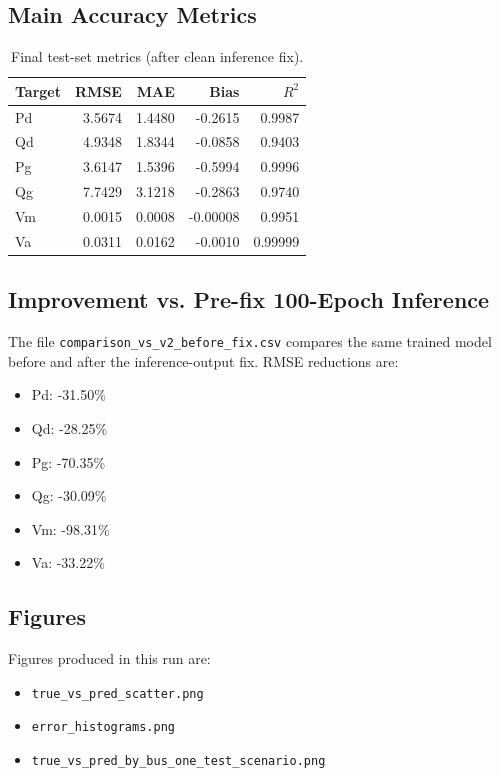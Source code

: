 \documentclass[11pt]{article}
\begin{document}
\subsection{Main Accuracy Metrics}
\begin{table}[h]
\centering
\caption{Final test-set metrics (after clean inference fix).}
\begin{tabular}{lrrrr}
\toprule
Target & RMSE & MAE & Bias & \(R^2\) \\
\midrule
Pd & 3.5674 & 1.4480 & -0.2615 & 0.9987 \\
Qd & 4.9348 & 1.8344 & -0.0858 & 0.9403 \\
Pg & 3.6147 & 1.5396 & -0.5994 & 0.9996 \\
Qg & 7.7429 & 3.1218 & -0.2863 & 0.9740 \\
Vm & 0.0015 & 0.0008 & -0.00008 & 0.9951 \\
Va & 0.0311 & 0.0162 & -0.0010 & 0.99999 \\
\bottomrule
\end{tabular}
\end{table}

\subsection{Improvement vs. Pre-fix 100-Epoch Inference}
The file \texttt{comparison\_vs\_v2\_before\_fix.csv} compares the same trained model before and after the inference-output fix. RMSE reductions are:
\begin{itemize}
    \item Pd: -31.50\%
    \item Qd: -28.25\%
    \item Pg: -70.35\%
    \item Qg: -30.09\%
    \item Vm: -98.31\%
    \item Va: -33.22\%
\end{itemize}

\subsection{Figures}
Figures produced in this run are:
\begin{itemize}
    \item \texttt{true\_vs\_pred\_scatter.png}
    \item \texttt{error\_histograms.png}
    \item \texttt{true\_vs\_pred\_by\_bus\_one\_test\_scenario.png}
\end{itemize}
\end{document}
